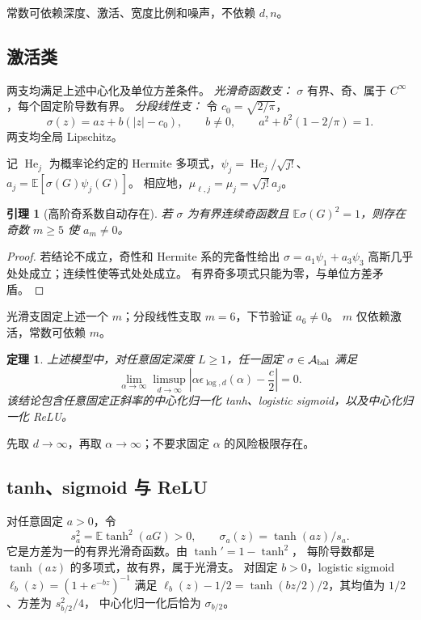 \documentclass[a4paper]{tufte-handout}
\newtheorem{theorem}{定理}
\newtheorem{lemma}{引理}
\newcommand{\E}{\mathbb E}
\begin{document}
\begin{fullwidth}
常数可依赖深度、激活、宽度比例和噪声，不依赖 $d,n$。

\subsection{激活类}
两支均满足上述中心化及单位方差条件。
\emph{光滑奇函数支：} $\sigma$ 有界、奇、属于 $C^\infty$，每个固定阶导数有界。
\emph{分段线性支：} 令 $c_0=\sqrt{2/\pi}$，
\begin{equation}\label{eq:pl}
\sigma(z)=az+b(|z|-c_0),\qquad
b\ne0,\qquad a^2+b^2(1-2/\pi)=1.
\end{equation}
两支均全局 Lipschitz。

记 $\operatorname{He}_j$ 为概率论约定的 Hermite 多项式，$\psi_j=\operatorname{He}_j/\sqrt{j!}$、$a_j=\E[\sigma(G)\psi_j(G)]$。
相应地，$\mu_{\ell,j}=\mu_j=\sqrt{j!}a_j$。
\begin{lemma}[高阶奇系数自动存在]\label{lem:automatic-hermite}
若 $\sigma$ 为有界连续奇函数且 $\E\sigma(G)^2=1$，则存在奇数 $m\ge5$ 使 $a_m\ne0$。
\end{lemma}
\begin{proof}
若结论不成立，奇性和 Hermite 系的完备性给出
$\sigma=a_1\psi_1+a_3\psi_3$ 高斯几乎处处成立；连续性使等式处处成立。
有界奇多项式只能为零，与单位方差矛盾。
\end{proof}
光滑支固定上述一个 $m$；分段线性支取 $m=6$，下节验证 $a_6\ne0$。
$m$ 仅依赖激活，常数可依赖 $m$。

\begin{theorem}\label{thm:main}
上述模型中，对任意固定深度 $L\ge1$，任一固定 $\sigma\in\mathcal A_{\rm bal}$ 满足
\begin{equation}\label{eq:main}
\boxed{\lim_{\alpha\to\infty}\limsup_{d\to\infty}
\left|\alpha \epsilon_{\log,d}(\alpha)-\frac c2\right|=0.}
\end{equation}
该结论包含任意固定正斜率的中心化归一化 tanh、logistic sigmoid，以及中心化归一化 ReLU。
\end{theorem}
先取 $d\to\infty$，再取 $\alpha\to\infty$；不要求固定 $\alpha$ 的风险极限存在。

\subsection{tanh、sigmoid 与 ReLU}
对任意固定 $a>0$，令
\[
s_a^2=\E\tanh^2(aG)>0,\qquad \sigma_a(z)=\tanh(az)/s_a.
\]
它是方差为一的有界光滑奇函数。由 $\tanh'=1-\tanh^2$，
每阶导数都是 $\tanh(az)$ 的多项式，故有界，属于光滑支。
对固定 $b>0$，logistic sigmoid $\ell_b(z)=(1+e^{-bz})^{-1}$ 满足
$\ell_b(z)-1/2=\tanh(bz/2)/2$，其均值为 $1/2$、方差为 $s_{b/2}^2/4$，
中心化归一化后恰为 $\sigma_{b/2}$。


\end{fullwidth}
\end{document}
